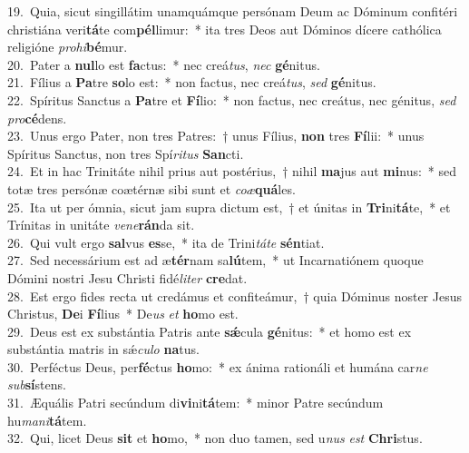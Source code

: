 {19.~}Quia, sicut singillátim unamquámque persónam Deum ac Dóminum confitéri christiána veri\textbf{tá}te com\textbf{pél}limur:~* ita tres Deos aut Dóminos dícere cathólica religióne \textit{pro}\textit{hi}\textbf{bé}mur.\\
{20.~}Pater a \textbf{nul}lo est \textbf{fa}ctus:~* nec creá\textit{tus}, \textit{nec} \textbf{gé}nitus.\\
{21.~}Fílius a \textbf{Pa}tre \textbf{so}lo est:~* non factus, nec creá\textit{tus}, \textit{sed} \textbf{gé}nitus.\\
{22.~}Spíritus Sanctus a \textbf{Pa}tre et \textbf{Fí}lio:~* non factus, nec creátus, nec génitus, \textit{sed} \textit{pro}\textbf{cé}dens.\\
{23.~}Unus ergo Pater, non tres Patres:~† unus Fílius, \textbf{non} tres \textbf{Fí}lii:~* unus Spíritus Sanctus, non tres Spí\textit{ri}\textit{tus} \textbf{San}cti.\\
{24.~}Et in hac Trinitáte nihil prius aut postérius,~† nihil \textbf{ma}jus aut \textbf{mi}nus:~* sed totæ tres persónæ coætérnæ sibi sunt et \textit{co}\textit{æ}\textbf{quá}les.\\
{25.~}Ita ut per ómnia, sicut jam supra dictum est,~† et únitas in \textbf{Tri}ni\textbf{tá}te,~* et Trínitas in unitáte \textit{ve}\textit{ne}\textbf{rán}da sit.\\
{26.~}Qui vult ergo \textbf{sal}vus \textbf{es}se,~* ita de Trini\textit{tá}\textit{te} \textbf{sén}tiat.\\
{27.~}Sed necessárium est ad æ\textbf{tér}nam sa\textbf{lú}tem,~* ut Incarnatiónem quoque Dómini nostri Jesu Christi fidé\textit{li}\textit{ter} \textbf{cre}dat.\\
{28.~}Est ergo fides recta ut credámus et confiteámur,~† quia Dóminus noster Jesus Christus, \textbf{De}i \textbf{Fí}lius~* De\textit{us} \textit{et} \textbf{ho}mo est.\\
{29.~}Deus est ex substántia Patris ante \textbf{sǽ}cula \textbf{gé}nitus:~* et homo est ex substántia matris in sǽ\textit{cu}\textit{lo} \textbf{na}tus.\\
{30.~}Perféctus Deus, per\textbf{fé}ctus \textbf{ho}mo:~* ex ánima rationáli et humána car\textit{ne} \textit{sub}\textbf{sí}stens.\\
{31.~}Æquális Patri secúndum di\textbf{vi}ni\textbf{tá}tem:~* minor Patre secúndum hu\textit{ma}\textit{ni}\textbf{tá}tem.\\
{32.~}Qui, licet Deus \textbf{sit} et \textbf{ho}mo,~* non duo tamen, sed u\textit{nus} \textit{est} \textbf{Chri}stus.\\
